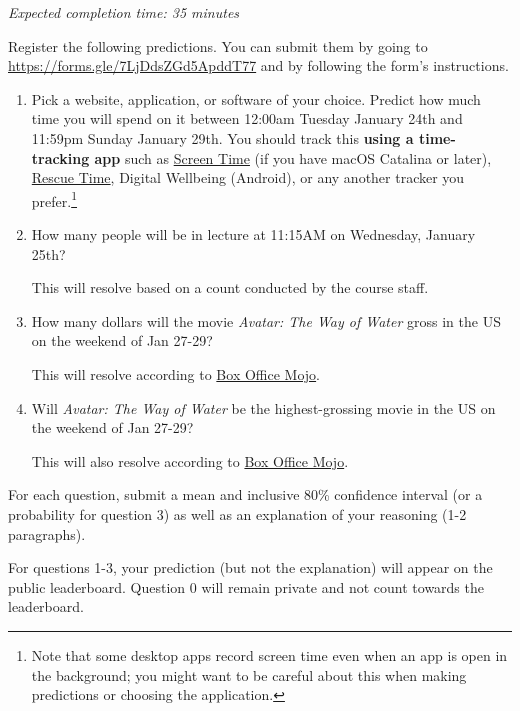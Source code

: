 \documentclass[11pt]{article}
\begin{document}
\emph{Expected completion time: 35 minutes}

Register the following predictions. You can submit them by going to 
\url{https://forms.gle/7LjDdsZGd5ApddT77} and by following the form's instructions.

\begin{enumerate}
\item[0.] Pick a website, application, or software of your choice. Predict how much time you will spend on it between 12:00am Tuesday January 24th and 11:59pm Sunday January 29th. You should track this {\bf using a time-tracking app} such as \href{https://support.apple.com/en-us/HT210387}{Screen Time} (if you have macOS Catalina or later), \href{https://www.rescuetime.com/}{Rescue Time}, Digital Wellbeing (Android), or any another tracker you prefer.\footnote{Note that some desktop apps record screen time even when an app is open in the background; you might want to be careful about this when making predictions or choosing the application.}

\item[1.] How many people will be in lecture at 11:15AM on Wednesday, January 25th?

      This will resolve based on a count conducted by the course staff.

\item[2.] How many dollars will the movie \emph{Avatar: The Way of Water} gross in the US on the weekend of Jan 27-29? 

      This will resolve according to \href{https://www.boxofficemojo.com/release/rl3372254721/weekend/?ref_=bo_rl_tab#tabs}{Box Office Mojo}.

  \item[3.] Will \emph{Avatar: The Way of Water} be the highest-grossing movie in the US on the weekend of Jan 27-29?

      This will also resolve according to \href{https://www.boxofficemojo.com/weekend/?ref_=bo_nb_wey_secondarytab}{Box Office Mojo}.

\end{enumerate}
 
For each question, submit a mean and inclusive 80\% confidence interval (or a probability for question 3) 
as well as an explanation of your reasoning (1-2 paragraphs).

For questions 1-3, your prediction (but not the explanation) will appear on the public leaderboard. 
Question 0 will remain private and not count towards the leaderboard.
\end{document}
